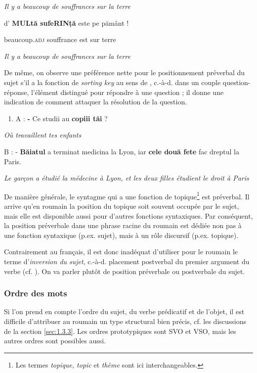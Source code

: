 {\itshape
Il y a beaucoup de souffrances sur la terre}

d'  \textbf{MULtă  sufeRINță}  este  pe  pământ !

  beaucoup.\textsc{adj}  souffrance  est  sur  terre

  \textit{Il y a beaucoup de souffrances sur la terre}

De même, on observe une préférence nette pour le positionnement préverbal du sujet s'il a la fonction de \textit{sorting key} au sens de \citet{Kuno1982}, c.-à-d. dans un couple question-réponse, l'élément distingué pour répondre à une question ; il donne une indication de comment attaquer la résolution de la question. 


\begin{enumerate}
\item A :  \textbf{-} Ce studii au \textbf{copiii tăi} ?  


\end{enumerate}
{\itshape
Où travaillent tes enfants}

B :  - \textbf{Băiatul} a terminat medicina la Lyon, iar \textbf{cele două fete} fac dreptul la Paris.

  \textit{Le garçon a étudié la médecine à Lyon, et les deux filles étudient le droit à Paris}

De manière générale, le syntagme qui a une fonction de topique\footnote{Les termes \textit{topique, topic} et \textit{thème} sont ici interchangeables.} est préverbal. Il arrive qu'en roumain la position du topique soit souvent occupée par le sujet, mais elle est disponible aussi pour d'autres fonctions syntaxiques. Par conséquent, la position préverbale dans une phrase racine du roumain est dédiée non pas à une fonction syntaxique (p.ex. sujet), mais à un rôle discursif (p.ex. topique).

Contrairement au français, il est donc inadéquat d'utiliser pour le roumain le terme d'\textit{inversion du sujet}, c.-à-d. placement postverbal du premier argument du verbe (cf. \citet{Marandin2003}). On va parler plutôt de position préverbale ou postverbale du sujet.

\subsubsection{Ordre des mots}
\label{bkm:Ref299315187}Si l'on prend en compte l'ordre du sujet, du verbe prédicatif et de l'objet, il est difficile d'attribuer au roumain un type structural bien précis, cf. les discussions de la section \ref{sec:1.3.3}. Les ordres prototypiques sont SVO et VSO, mais les autres ordres sont possibles aussi.

